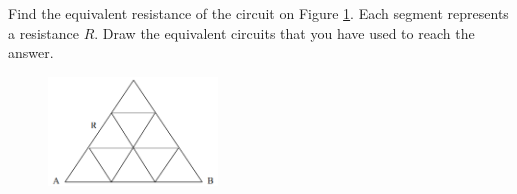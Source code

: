 \documentclass[../TST.tex]{subfiles}
\begin{document}
\begin{pproblem}
Find the equivalent resistance of the circuit on Figure \ref{fig1}. Each segment represents a resistance $R$. Draw the equivalent circuits that you have used to reach the answer.

\begin{figure}[h]
\centering
\includegraphics[width=0.4\textwidth]{fig/2009_s5.png}
\caption{}
\label{fig1}
\end{figure}

\end{pproblem}
\end{document}
